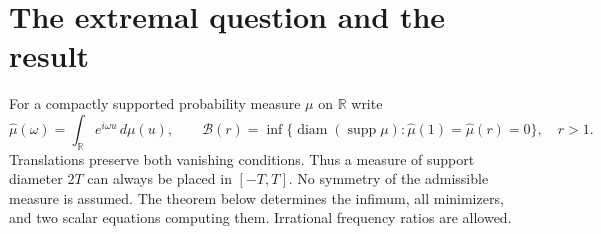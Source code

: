 
\section{The extremal question and the result}

For a compactly supported probability measure $\mu$ on $\mathbb R$ write
\[
 \widehat\mu(\omega)=\int_{\mathbb R}e^{i\omega u}\,d\mu(u),
 \qquad
 \mathcal B(r)=\inf\{\operatorname{diam}(\operatorname{supp}\mu):
       \widehat\mu(1)=\widehat\mu(r)=0\},\quad r>1.
\]
Translations preserve both vanishing conditions.  Thus a measure of support
diameter $2T$ can always be placed in $[-T,T]$.  No symmetry of the admissible
measure is assumed.  The theorem below determines the infimum, all minimizers,
and two scalar equations computing them.  Irrational frequency ratios are
allowed.

